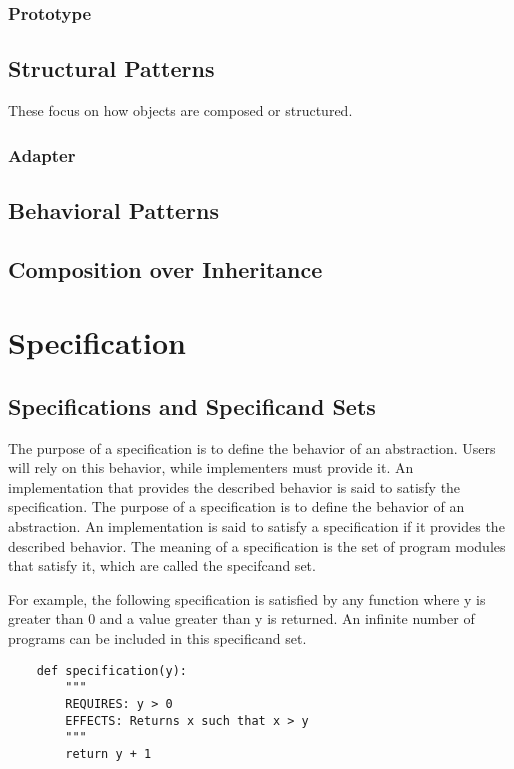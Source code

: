 \documentclass[oneside,11pt,dvipsnames]{book}
\begin{document}
\subsection{Prototype}

\section{Structural Patterns}
These focus on how objects are composed or structured.

\subsection{Adapter}


\section{Behavioral Patterns}

\section{Composition over Inheritance}

\chapter{Specification}

\section{Specifications and Specificand Sets}

The purpose of a specification is to define the behavior of an abstraction. Users will rely on this behavior, while implementers must provide it. An implementation that provides the described behavior is said to satisfy the specification. The purpose of a specification is to define the behavior of an abstraction. An implementation is said to satisfy a specification if it provides the described behavior. The meaning of a specification is the set of program modules that satisfy it, which are called the specifcand set.

For example, the following specification is satisfied by any function where y is greater than 0 and a value greater than y is returned. An infinite number of programs can be included in this specificand set.
\begin{lstlisting}
    def specification(y):
        """
        REQUIRES: y > 0
        EFFECTS: Returns x such that x > y
        """
        return y + 1

    
\end{lstlisting}
\end{document}
